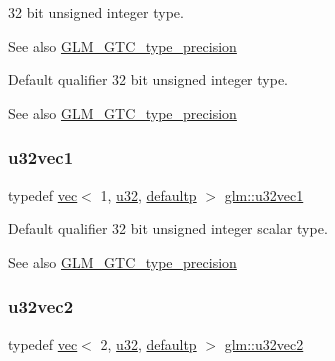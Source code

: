 32 bit unsigned integer type. \begin{DoxySeeAlso}{See also}
\mbox{\hyperlink{group__gtc__type__precision}{G\+L\+M\+\_\+\+G\+T\+C\+\_\+type\+\_\+precision}}
\end{DoxySeeAlso}
Default qualifier 32 bit unsigned integer type. \begin{DoxySeeAlso}{See also}
\mbox{\hyperlink{group__gtc__type__precision}{G\+L\+M\+\_\+\+G\+T\+C\+\_\+type\+\_\+precision}} 
\end{DoxySeeAlso}
\mbox{\label{group__gtc__type__precision_ga99f64714ce341e34036bd10c8b36823a}} 
\subsubsection{\texorpdfstring{u32vec1}{u32vec1}}
{\footnotesize\ttfamily typedef \mbox{\hyperlink{structglm_1_1vec}{vec}}$<$ 1, \mbox{\hyperlink{group__gtc__type__precision_ga54e837745059fd29017bed71cfa0a8db}{u32}}, \mbox{\hyperlink{namespaceglm_a36ed105b07c7746804d7fdc7cc90ff25a9d21ccd8b5a009ec7eb7677befc3bf51}{defaultp}} $>$ \mbox{\hyperlink{group__gtc__type__precision_ga99f64714ce341e34036bd10c8b36823a}{glm\+::u32vec1}}}

Default qualifier 32 bit unsigned integer scalar type. \begin{DoxySeeAlso}{See also}
\mbox{\hyperlink{group__gtc__type__precision}{G\+L\+M\+\_\+\+G\+T\+C\+\_\+type\+\_\+precision}} 
\end{DoxySeeAlso}
\mbox{\label{group__gtc__type__precision_gad854a1005ce84d8f6e8f05e42893f5c9}} 
\subsubsection{\texorpdfstring{u32vec2}{u32vec2}}
{\footnotesize\ttfamily typedef \mbox{\hyperlink{structglm_1_1vec}{vec}}$<$ 2, \mbox{\hyperlink{group__gtc__type__precision_ga54e837745059fd29017bed71cfa0a8db}{u32}}, \mbox{\hyperlink{namespaceglm_a36ed105b07c7746804d7fdc7cc90ff25a9d21ccd8b5a009ec7eb7677befc3bf51}{defaultp}} $>$ \mbox{\hyperlink{group__gtc__type__precision_gad854a1005ce84d8f6e8f05e42893f5c9}{glm\+::u32vec2}}}

